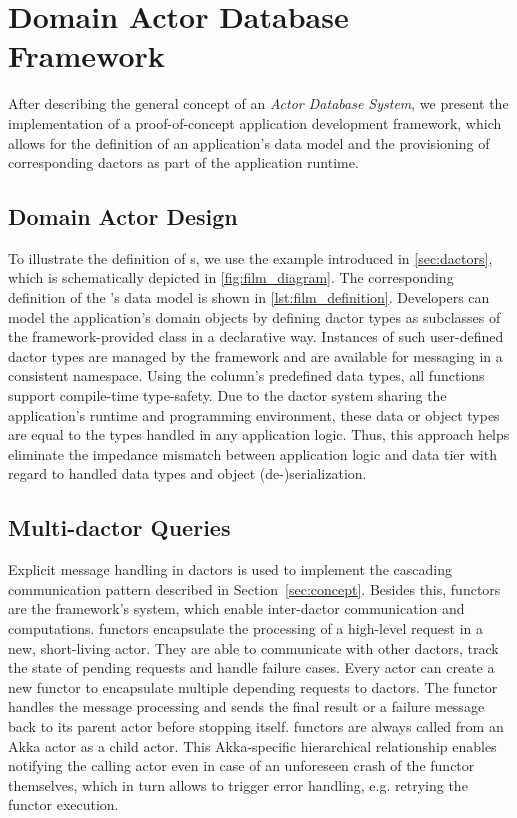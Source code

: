 
\section{Domain Actor Database Framework}\label{sec:framework}
  After describing the general concept of an \textit{Actor Database System}, we present the implementation of a proof-of-concept application development framework, which allows for the definition of an application's data model and the provisioning of corresponding \glspl{dactor} as part of the application runtime.

  \subsection{Domain Actor Design}\label{subsec:domain_actor_design}
    To illustrate the definition of s, we use the example introduced in \cref{sec:dactors}, which is schematically depicted in \cref{fig:film_diagram}.
    The corresponding definition of the 's data model is shown in \cref{lst:film_definition}.
    Developers can model the application's domain objects by defining \gls{dactor} types as subclasses of the framework-provided  class in a declarative way.
    Instances of such user-defined \gls{dactor} types are managed by the framework and are available for messaging in a consistent namespace.
    Using the column's predefined data types, all functions support compile-time type-safety.
    Due to the \gls{dactor} system sharing the application's runtime and programming environment, these data or object types are equal to the types handled in any application logic.
    Thus, this approach helps eliminate the impedance mismatch between application logic and data tier with regard to handled data types and object (de-)serialization.
  
  \subsection[Multi-Dactor Queries]{Multi-\Gls{dactor} Queries}\label{subsec:multi_dactor_queries}
    Explicit message handling in \glspl{dactor} is used to implement the cascading communication pattern described in Section~\ref{sec:concept}.
    Besides this, \glspl{functor} are the framework's system, which enable inter-\gls{dactor} communication and computations.
    \Glspl{functor} encapsulate the processing of a high-level request in a new, short-living actor.
    They are able to communicate with other \glspl{dactor}, track the state of pending requests and handle failure cases.
    Every actor can create a new \gls{functor} to encapsulate multiple depending requests to \glspl{dactor}.
    The \gls{functor} handles the message processing and sends the final result or a failure message back to its parent actor before stopping itself.
    \Glspl{functor} are always called from an Akka actor as a child actor.
    This Akka-specific hierarchical relationship enables notifying the calling actor even in case of an unforeseen crash of the \gls{functor} themselves, which in turn allows to trigger error handling, e.g. retrying the \gls{functor} execution.
    
